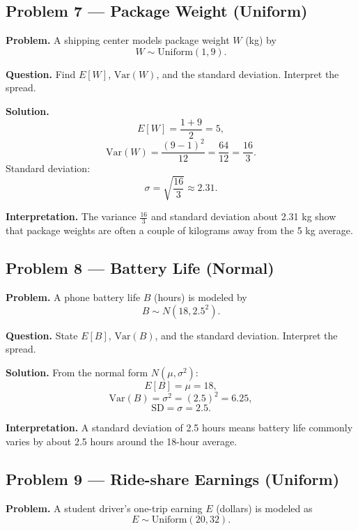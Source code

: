 \begin{ExamProblems}

\item
\subsection*{Problem 7 — Package Weight (Uniform)}

\textbf{Problem.}
A shipping center models package weight \(W\) (kg) by
\[
W\sim \text{Uniform}(1,9).
\]

\textbf{Question.} Find \(E[W]\), \(\mathrm{Var}(W)\), and the standard deviation. Interpret the spread.

\textbf{Solution.}
\[
E[W]=\frac{1+9}{2}=5,
\]
\[
\mathrm{Var}(W)=\frac{(9-1)^2}{12}=\frac{64}{12}=\frac{16}{3}.
\]
Standard deviation:
\[
\sigma=\sqrt{\frac{16}{3}}\approx 2.31.
\]

\textbf{Interpretation.}
The variance \(\frac{16}{3}\) and standard deviation about 2.31 kg show that package weights are often a couple of kilograms away from the 5 kg average.


\item
\subsection*{Problem 8 — Battery Life (Normal)}

\textbf{Problem.}
A phone battery life \(B\) (hours) is modeled by
\[
B\sim N(18,2.5^2).
\]

\textbf{Question.} State \(E[B]\), \(\mathrm{Var}(B)\), and the standard deviation. Interpret the spread.

\textbf{Solution.}
From the normal form \(N(\mu,\sigma^2)\):
\[
E[B]=\mu=18,
\]
\[
\mathrm{Var}(B)=\sigma^2=(2.5)^2=6.25,
\]
\[
\text{SD}=\sigma=2.5.
\]

\textbf{Interpretation.}
A standard deviation of 2.5 hours means battery life commonly varies by about 2.5 hours around the 18-hour average.


\item
\subsection*{Problem 9 — Ride-share Earnings (Uniform)}

\textbf{Problem.}
A student driver's one-trip earning \(E\) (dollars) is modeled as
\[
E\sim \text{Uniform}(20,32).
\]


\end{ExamProblems}
